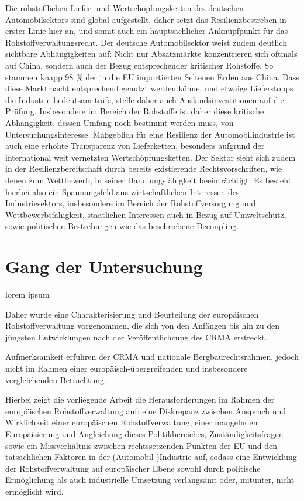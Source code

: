 \documentclass[12pt,a4paper,oneside]{book} %
\begin{document}
Die rohstofflichen Liefer- und Wertschöpfungsketten des deutschen Automobilsektors sind global aufgestellt, daher setzt das Resilienzbestreben in erster Linie hier an, und somit auch ein hauptsächlicher Anknüpfpunkt für das Rohstoffverwaltungsrecht. Der deutsche Automobilsektor weist zudem deutlich sichtbare Abhängigkeiten auf: Nicht nur Absatzmärkte konzentrieren sich oftmals auf China, sondern auch der Bezug entsprechender kritischer Rohstoffe. So stammen knapp 98 \% der in die EU importierten Seltenen Erden aus China.\autocite[4]{gaus_rare_2021} Dass diese Marktmacht entsprechend genutzt werden könne, und etwaige Lieferstopps die Industrie bedeutsam träfe, stelle daher auch Auslandsinvestitionen auf die Prüfung.\autocite[64]{becker_vom_2023} Insbesondere im Bereich der Rohstoffe ist daher diese kritische Abhängigkeit, dessen Umfang noch bestimmt werden muss, von Untersuchungsinteresse. Maßgeblich für eine Resilienz der Automobilindustrie ist auch eine erhöhte Transparenz von Lieferketten, besonders aufgrund der international weit vernetzten Wertschöpfungsketten.\autocite[9]{kagermann_resilienz_2021} Der Sektor sieht sich zudem in der Resilienzbereitschaft durch bereits existierende Rechtsvorschriften, wie denen zum Wettbewerb, in seiner Handlungsfähigkeit beeinträchtigt.\autocite[19]{kagermann_resilienz_2021} Es besteht hierbei also ein Spannungsfeld aus wirtschaftlichen Interessen des Industriesektors, insbesondere im Bereich der Rohstoffversorgung und Wettbewerbsfähigkeit, staatlichen Interessen auch in Bezug auf Umweltschutz, sowie politischen Bestrebungen wie das beschriebene Decoupling.

\section{Gang der Untersuchung}
lorem ipsum

Daher wurde eine Charakterisierung und Beurteilung der europäischen Rohstoffverwaltung vorgenommen, die sich von den Anfängen bis hin zu den jüngsten Entwicklungen nach der Veröffentlichcung des CRMA erstreckt. 

Aufmerksamkeit erfuhren der CRMA und nationale Bergbaurechtsrahmen, jedoch nicht im Rahmen einer europäisch-übergreifenden und insbesondere vergleichenden Betrachtung.

Hierbei zeigt die vorliegende Arbeit die Herausforderungen im Rahmen der europöischen Rohstoffverwaltung auf: eine Diskrepanz zwischen Anspruch und Wirklichkeit einer europäischen Rohstoffverwaltung, einer mangelnden Europäisierung und Angleichung dieses Politikbereiches, Zuständigkeitsfragen sowie ein Missverhältnis zwischen rechtssetzenden Punkten der EU und den tatsächlichen Faktoren in der (Automobil-)Industrie auf, sodass eine Entwicklung der Rohstoffverwaltung auf europäischer Ebene sowohl durch politische Ermöglichung als auch industrielle Umsetzung verlangsamt oder, mitunter, nicht ermöglicht wird.
\end{document}
